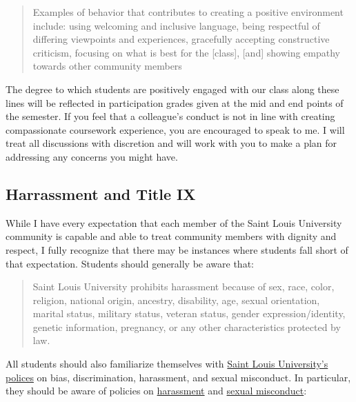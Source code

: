 \documentclass[
]{book}
\begin{document}
\begin{quote}
Examples of behavior that contributes to creating a positive environment include: using welcoming and inclusive language, being respectful of differing viewpoints and experiences, gracefully accepting constructive criticism, focusing on what is best for the {[}class{]}, {[}and{]} showing empathy towards other community members
\end{quote}

The degree to which students are positively engaged with our class along these lines will be reflected in participation grades given at the mid and end points of the semester. If you feel that a colleague's conduct is not in line with creating compassionate coursework experience, you are encouraged to speak to me. I will treat all discussions with discretion and will work with you to make a plan for addressing any concerns you might have.

\hypertarget{harrassment-and-title-ix}{%
\subsection{Harrassment and Title IX}\label{harrassment-and-title-ix}}

While I have every expectation that each member of the Saint Louis University community is capable and able to treat community members with dignity and respect, I fully recognize that there may be instances where students fall short of that expectation. Students should generally be aware that:

\begin{quote}
Saint Louis University prohibits harassment because of sex, race, color, religion, national origin, ancestry, disability, age, sexual orientation, marital status, military status, veteran status, gender expression/identity, genetic information, pregnancy, or any other characteristics protected by law.
\end{quote}

All students should also familiarize themselves with \href{http://www.slu.edu/general-counsel-home/office-of-institutional-equity-and-diversity}{Saint Louis University's polices} on bias, discrimination, harassment, and sexual misconduct. In particular, they should be aware of policies on \href{https://www.slu.edu/general-counsel/institutional-equity-diversity/pdfs/harassment-policy.pdf}{harassment} and \href{https://www.slu.edu/about/safety/sexual-assault-resources.php}{sexual misconduct}:
\end{document}
